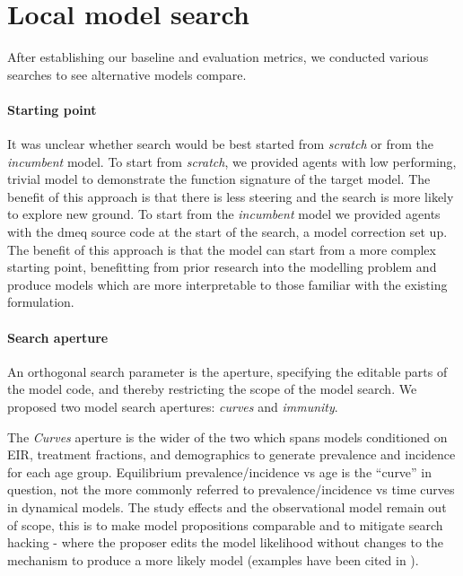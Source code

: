 \documentclass[11pt]{article}
\begin{document}
\section{Local model search}

After establishing our baseline and evaluation metrics, we conducted various searches to see alternative models compare.

\paragraph{Starting point}

It was unclear whether search would be best started from \emph{scratch} or from the \emph{incumbent} model. To start from \emph{scratch}, we provided agents with low performing, trivial model to demonstrate the function signature of the target model. The benefit of this approach is that there is less steering and the search is more likely to explore new ground. To start from the \emph{incumbent} model we provided agents with the dmeq source code at the start of the search, a model correction set up. The benefit of this approach is that the model can start from a more complex starting point, benefitting from prior research into the modelling problem and produce models which are more interpretable to those familiar with the existing formulation.

\paragraph{Search aperture}

An orthogonal search parameter is the aperture, specifying the editable parts of the model code, and thereby restricting the scope of the model search. We proposed two model search apertures: \emph{curves} and \emph{immunity}.

The \emph{Curves} aperture is the wider of the two which spans models conditioned on EIR, treatment fractions, and demographics to generate prevalence and incidence for each age group. Equilibrium prevalence/incidence vs age is the ``curve'' in question, not the more commonly referred to prevalence/incidence vs time curves in dynamical models. The study effects and the observational model remain out of scope, this is to make model propositions comparable and to mitigate search hacking - where the proposer edits the model likelihood without changes to the mechanism to produce a more likely model (examples have been cited in \citep{Karwowski2026Aug}).
\end{document}
